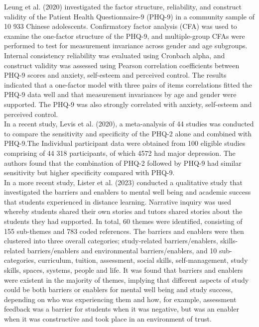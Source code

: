 \documentclass[12pt]{article}
\numberwithin{equation}{section}
\begin{document}
	\noindent Leung et al. (2020) investigated the factor structure, reliability, and construct validity of the Patient Health Questionnaire-9 (PHQ-9) in a community sample of 10 933 Chinese adolescents. Confirmatory factor analysis (CFA) was used to examine the one-factor structure of the PHQ-9, and multiple-group CFAs were performed to test for measurement invariance across gender and age subgroups. Internal consistency reliability was evaluated using Cronbach alpha, and construct validity was assessed using Pearson correlation coefficients between PHQ-9 scores and anxiety, self-esteem and perceived control. The results indicated that a one-factor model with three pairs of items correlations fitted the PHQ-9 data well and that measurement invariances by age and gender were supported. The PHQ-9 was also strongly correlated with anxiety, self-esteem and perceived control.\\
	
	\noindent In a recent study, Levis et al. (2020), a meta-analysis of 44 studies was conducted to compare the sensitivity and specificity of the PHQ-2 alone and combined with PHQ-9.The Individual participant data were obtained from 100 eligible studies comprising of 44 318 participants, of which 4572 had major depression. The authors found that the combination of PHQ-2 followed by PHQ-9 had similar sensitivity but higher specificity compared with PHQ-9.\\
	
	\noindent In a more recent study, Lister et al. (2023) conducted a qualitative study that investigated the barriers and enablers to mental well being and academic success that students experienced in distance learning. Narrative inquiry was used whereby students shared their own stories and tutors shared stories about the students they had supported. In total, 60 themes were identified, consisting of 155 sub-themes and 783 coded references. The barriers and enablers were then clustered into three overall categories; study-related barriers/enablers, skills-related barriers/enablers and environmental barriers/enablers, and 10 sub-categories, curriculum, tuition, assessment, social skills, self-management, study skills, spaces, systems, people and life. It was found that barriers and enablers were existent in the majority of themes, implying that different aspects of study could be both barriers or enablers for mental well being and study success, depending on who was experiencing them and how, for example, assessment feedback was a barrier for students when it was negative, but was an enabler when it was constructive and took place in an environment of trust.\\
	
\end{document}
